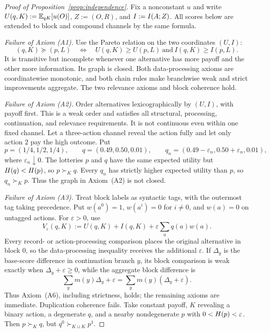 \begin{proof}[Proof of Proposition~\ref{prop:independence}]
Fix a nonconstant $u$ and write $U(q,K):=\mathbb E_{qK}[u(O)]$, $Z:=(O,R)$, and $I:=I(A;Z)$.  All scores below are
extended to block and compound channels by the same formula.

\emph{Failure of Axiom \textup{(A1)}.}
Use the Pareto relation on the two coordinates $(U,I)$:
\[
 (q,K)\succeq(p,L)
 \quad\Longleftrightarrow\quad
 U(q,K)\ge U(p,L)\ \text{and}\ I(q,K)\ge I(p,L).
\]
It is transitive but incomplete whenever one alternative has more payoff and the other more information.  Its graph is
closed.  Both data-processing axioms are coordinatewise monotonic, and both chain rules make branchwise weak and strict
improvements aggregate.  The two relevance axioms and block coherence hold.

\emph{Failure of Axiom \textup{(A2)}.}
Order alternatives lexicographically by $(U,I)$, with payoff first.  This is a weak order and satisfies all structural,
processing, continuation, and relevance requirements.  It is not continuous even within one fixed channel.  Let a
three-action channel reveal the action fully and let only action $2$ pay the high outcome.  Put
\[
 p=(1/4,1/2,1/4),\qquad q=(0.49,0.50,0.01),\qquad
 q_n=(0.49-\varepsilon_n,0.50+\varepsilon_n,0.01),
\]
where $\varepsilon_n\downarrow0$.  The lotteries $p$ and $q$ have the same expected utility but
$H(q)<H(p)$, so $p\succ_Kq$.  Every $q_n$ has strictly higher expected utility than $p$, so
$q_n\succ_Kp$.  Thus the graph in Axiom~\textup{(A2)} is not closed.

\emph{Failure of Axiom \textup{(A3)}.}
Treat block labels as syntactic tags, with the outermost tag taking precedence.  Put $w(a^0)=1$, $w(a^i)=0$ for
$i\ne0$, and $w(a)=0$ on untagged actions.  For $\varepsilon>0$, use
\[
 V_\varepsilon(q,K):=U(q,K)+I(q,K)+\varepsilon\sum_aq(a)w(a).
\]
Every record- or action-processing comparison places the original alternative in block $0$, so the data-processing
inequality receives the additional $\varepsilon$.  If $\Delta_y$ is the base-score difference in continuation branch
$y$, its block comparison is weak exactly when $\Delta_y+\varepsilon\ge0$, while the aggregate block difference is
\[
 \sum_y m(y)\Delta_y+\varepsilon
 =\sum_y m(y)(\Delta_y+\varepsilon).
\]
Thus Axiom~\textup{(A6)}, including strictness, holds; the remaining axioms are immediate.  Duplication coherence fails.
Take constant payoff, $K$ revealing a binary action, a degenerate $q$, and a nearby nondegenerate $p$ with
$0<H(p)<\varepsilon$.  Then $p\succ_Kq$, but $q^0\succ_{K\sqcup K}p^1$.


\end{proof}
